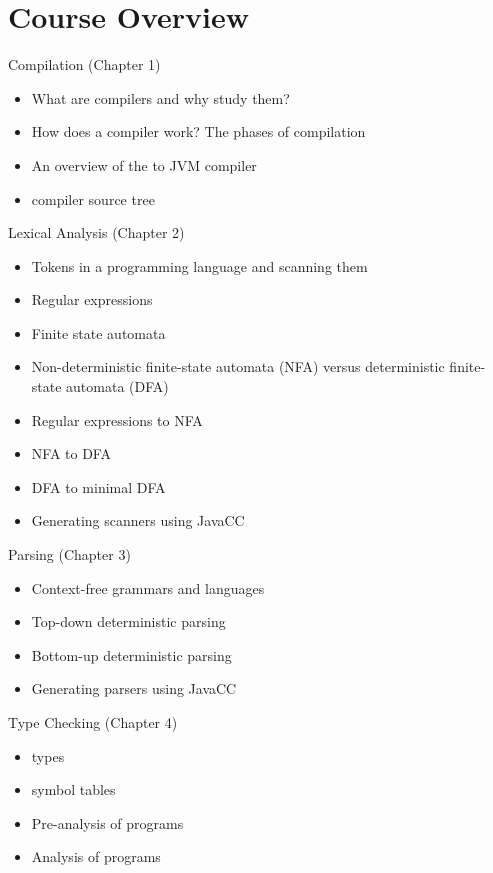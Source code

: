 \documentclass[8pt,a4paper,compress]{beamer}
\begin{document}
\section{Course Overview}

\begin{frame}[fragile]
\pause

Compilation (Chapter 1)
\begin{itemize}
\item What are compilers and why study them?
\item How does a compiler work? The phases of compilation
\item An overview of the \jmm to JVM compiler
\item \jmm compiler source tree
\end{itemize}

\pause
\bigskip

Lexical Analysis (Chapter 2)
\begin{itemize}
\item Tokens in a programming language and scanning them
\item Regular expressions
\item Finite state automata
\item Non-deterministic finite-state automata (NFA) versus deterministic finite-state automata (DFA)
\item Regular expressions to NFA
\item NFA to DFA
\item DFA to minimal DFA
\item Generating scanners using JavaCC
\end{itemize}
\end{frame}

\begin{frame}[fragile]
\pause

Parsing (Chapter 3)
\begin{itemize}
\item Context-free grammars and languages
\item Top-down deterministic parsing
\item Bottom-up deterministic parsing
\item Generating parsers using JavaCC
\end{itemize}

\pause
\bigskip

Type Checking (Chapter 4)
\begin{itemize}
\item \jmm types
\item \jmm symbol tables
\item Pre-analysis of \jmm programs
\item Analysis of \jmm programs
\end{itemize}
\end{frame}
\end{document}
